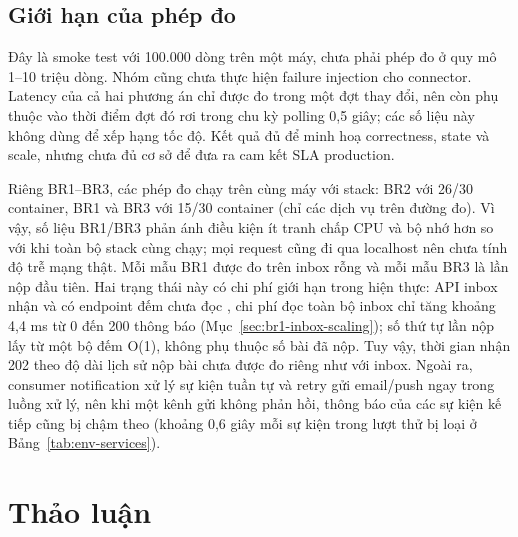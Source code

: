 \subsection{Giới hạn của phép đo}

Đây là smoke test với 100.000 dòng trên một máy, chưa phải phép đo ở quy mô 1--10 triệu dòng. Nhóm cũng chưa thực hiện failure injection cho connector. Latency của cả hai phương án chỉ được đo trong một đợt thay đổi, nên còn phụ thuộc vào thời điểm đợt đó rơi trong chu kỳ polling 0,5 giây; các số liệu này không dùng để xếp hạng tốc độ. Kết quả đủ để minh hoạ correctness, state và scale, nhưng chưa đủ cơ sở để đưa ra cam kết SLA production.

Riêng BR1--BR3, các phép đo chạy trên cùng máy với stack: BR2 với 26/30 container, BR1 và BR3 với 15/30 container (chỉ các dịch vụ trên đường đo). Vì vậy, số liệu BR1/BR3 phản ánh điều kiện ít tranh chấp CPU và bộ nhớ hơn so với khi toàn bộ stack cùng chạy; mọi request cũng đi qua localhost nên chưa tính độ trễ mạng thật. Mỗi mẫu BR1 được đo trên inbox rỗng và mỗi mẫu BR3 là lần nộp đầu tiên. Hai trạng thái này có chi phí giới hạn trong hiện thực: API inbox nhận  và có endpoint đếm chưa đọc , chi phí đọc toàn bộ inbox chỉ tăng khoảng 4,4 ms từ 0 đến 200 thông báo (Mục~\ref{sec:br1-inbox-scaling}); số thứ tự lần nộp lấy từ một bộ đếm O(1), không phụ thuộc số bài đã nộp. Tuy vậy, thời gian nhận 202 theo độ dài lịch sử nộp bài chưa được đo riêng như với inbox. Ngoài ra, consumer notification xử lý sự kiện tuần tự và retry gửi email/push ngay trong luồng xử lý, nên khi một kênh gửi không phản hồi, thông báo của các sự kiện kế tiếp cũng bị chậm theo (khoảng 0,6 giây mỗi sự kiện trong lượt thử bị loại ở Bảng~\ref{tab:env-services}).

\section{Thảo luận}

